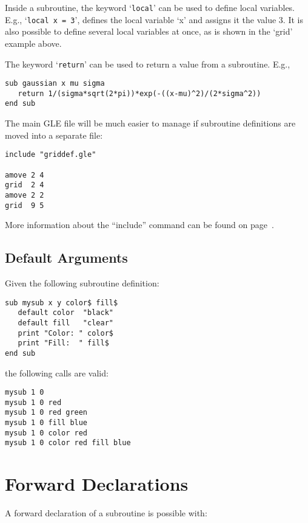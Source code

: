 Inside a subroutine, the keyword `\texttt{local}' can be used to define local variables. E.g., `\texttt{local x = 3}', defines the local variable `x' and assigns it the value 3. It is also possible to define several local variables at once, as is shown in the `grid' example above.

The keyword `\texttt{return}' can be used to return a value from a subroutine. E.g.,

\preglecode{}
\begin{Verbatim}
sub gaussian x mu sigma
   return 1/(sigma*sqrt(2*pi))*exp(-((x-mu)^2)/(2*sigma^2))
end sub
\end{Verbatim}
\postglecode{}

The main GLE file will be much easier to manage if subroutine definitions are moved into a separate file:

\preglecode{}
\begin{Verbatim}
include "griddef.gle"

amove 2 4
grid  2 4
amove 2 2
grid  9 5
\end{Verbatim}
\postglecode{}

More information about the ``include'' command can be found on page~\pageref{incl:cmnd}.

\subsection{Default Arguments}

Given the following subroutine definition:

\preglecode{}
\begin{Verbatim}
sub mysub x y color$ fill$
   default color  "black"
   default fill   "clear"
   print "Color: " color$
   print "Fill:  " fill$
end sub
\end{Verbatim}
\postglecode{}

\noindent{}the following calls are valid:

\preglecode{}
\begin{Verbatim}
mysub 1 0
mysub 1 0 red
mysub 1 0 red green
mysub 1 0 fill blue
mysub 1 0 color red
mysub 1 0 color red fill blue
\end{Verbatim}
\postglecode{}

\section{Forward Declarations}

A forward declaration of a subroutine is possible with:

